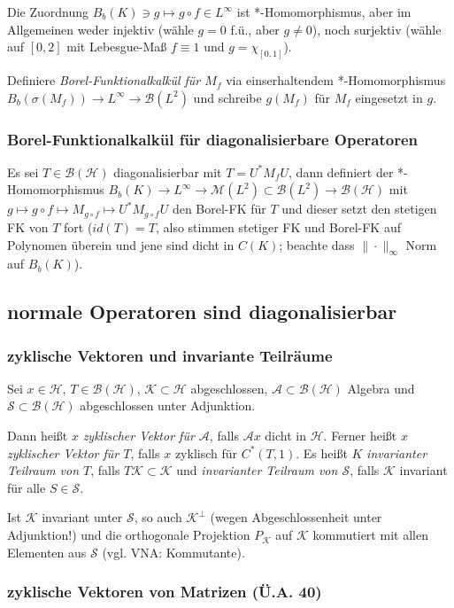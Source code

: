 \documentclass[11pt,a4paper]{scrartcl}
\newcommand{\Hc}{\mathcal{H}}
\newcommand{\Sc}{\mathcal{S}}
\newcommand{\Kc}{\mathcal{K}}
\newcommand{\A}{\mathcal{A}}
\newcommand{\B}{\mathcal{B}}
\newcommand{\M}{\mathcal{M}}
\theoremstyle{plain}
\theoremstyle{definition}
\theoremstyle{remark}
\begin{document}
Die Zuordnung $B_b(K) \ni g \mapsto g\circ f \in L^\infty$ ist *-Homomorphismus, aber im Allgemeinen weder injektiv (wähle $g=0$ f.ü., aber $g\neq 0$), noch surjektiv (wähle auf $[0,2]$ mit Lebesgue-Maß $f\equiv 1$ und $g=\chi_{[0,1]}$).

Definiere \emph{Borel-Funktionalkalkül für $M_f$} via einserhaltendem *-Homomorphismus $B_b(\sigma(M_f)) \to L^\infty \to \B(L^2)$ und schreibe $g(M_f)$ für $M_f$ eingesetzt in $g$. 

\subsubsection{Borel-Funktionalkalkül für diagonalisierbare Operatoren}

Es sei $T\in \B(\Hc)$ diagonalisierbar mit $T=U^*M_f U$, dann definiert der *-Homomorphismus $B_b(K)\to L^\infty \to \M(L^2) \subset \B(L^2) \to \B(\Hc)$ mit $g\mapsto g\circ f \mapsto M_{g\circ f} \mapsto U^* M_{g\circ f} U$ den Borel-FK für $T$ und dieser setzt den stetigen FK von $T$ fort ($id(T)=T$, also stimmen stetiger FK und Borel-FK auf Polynomen überein und jene sind dicht in $C(K)$; beachte dass $\|\cdot\|_\infty$ Norm auf $B_b(K)$).

\subsection{normale Operatoren sind diagonalisierbar}

\subsubsection{zyklische Vektoren und invariante Teilräume}

Sei $x\in \Hc$, $T\in \B(\Hc)$, $\Kc \subset \Hc$ abgeschlossen, $\A \subset \B(\Hc)$ Algebra und $\Sc \subset \B(\Hc)$ abgeschlossen unter Adjunktion.

Dann heißt $x$ \emph{zyklischer Vektor für $\A$}, falls $\A x$ dicht in $\Hc$. Ferner heißt $x$ \emph{zyklischer Vektor für $T$}, falls $x$ zyklisch für $C^*(T,1)$. Es heißt $K$ \emph{invarianter Teilraum von $T$}, falls $T\Kc \subset \Kc$ und \emph{invarianter Teilraum von $\Sc$}, falls $\Kc$ invariant für alle $S\in \Sc$. 

Ist $\Kc$ invariant unter $\Sc$, so auch $\Kc^\bot$ (wegen Abgeschlossenheit unter Adjunktion!) und die orthogonale Projektion $P_\Kc$ auf $\Kc$ kommutiert mit allen Elementen aus $\Sc$ (vgl. VNA: Kommutante).

\subsubsection{zyklische Vektoren von Matrizen (Ü.A. 40)}
\end{document}
